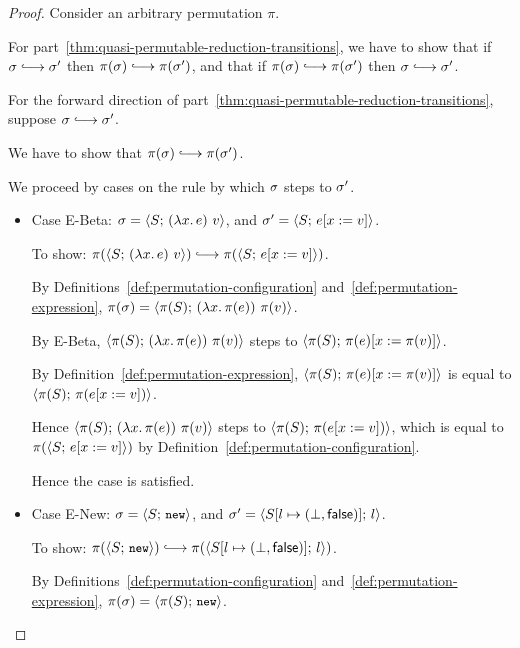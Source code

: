 \begin{proof}
  Consider an arbitrary permutation $\pi$.

  For part~\ref{thm:quasi-permutable-reduction-transitions}, we have
  to show that if $\conf \parstepsto \conf'$ then $\pi(\conf)
  \parstepsto \pi(\conf')$, and that if $\pi(\conf) \parstepsto
  \pi(\conf')$ then $\conf \parstepsto \conf'$.

  For the forward direction of
  part~\ref{thm:quasi-permutable-reduction-transitions}, suppose
  $\conf \parstepsto \conf'$.

  We have to show that $\pi(\conf) \parstepsto \pi(\conf')$.

  We proceed by cases on the rule by which $\sigma$ steps to $\sigma'$.

  \begin{itemize}
  \item Case {\sc E-Beta}: $\sigma =
    \langle S;\, (\lambda x.\,e)~v \rangle$, and $\sigma' =
    \langle S;\, e[x := v] \rangle$.

    To show: $\pi(\config{S}{\app{(\lam{x}{e})}{v}}) \parstepsto
    \pi(\config{S}{\subst{e}{x}{v}})$.

    By Definitions~\ref{def:permutation-configuration}
    and~\ref{def:permutation-expression}, $\pi(\sigma) =
    \langle \pi(S);\, (\lambda x.\,\pi(e))~\pi(v) \rangle$.

    By {\sc E-Beta},
    $\langle \pi(S);\, (\lambda x.\,\pi(e))~\pi(v) \rangle$ steps to
    $\langle \pi(S);\, \pi(e)[x := \pi(v)] \rangle$.

    By Definition~\ref{def:permutation-expression},
    $\langle \pi(S);\, \pi(e)[x := \pi(v)] \rangle$ is equal to
    $\langle \pi(S);\, \pi(e[x := v]) \rangle$.

    Hence $\langle \pi(S);\, (\lambda x.\,\pi(e))~\pi(v) \rangle$ steps
    to $\langle \pi(S);\, \pi(e[x := v]) \rangle$, which is equal to
    $\pi(\langle S;\, e[x := v] \rangle)$ by
    Definition~\ref{def:permutation-configuration}.

    Hence the case is satisfied.

  \item Case {\sc E-New}: $\sigma = \langle S;\, \mbox{\small{\texttt{new}}} \rangle$, and $\sigma' =
    \langle S[l \mapsto (\bot, \textsf{false})];\, l \rangle$.

    To show: $\pi(\config{S}{\NEW}) \parstepsto
    \pi(\config{\extS{S}{l}{\bot}{\frozenfalse}}{l})$.

    By Definitions~\ref{def:permutation-configuration}
    and~\ref{def:permutation-expression}, $\pi(\sigma) =
    \langle \pi(S);\, \mbox{\small{\texttt{new}}} \rangle$.


\end{itemize}
\end{proof}
